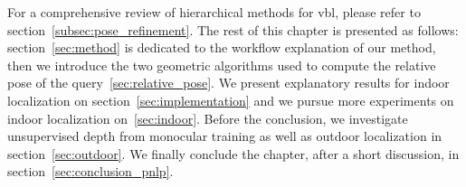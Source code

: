 For a comprehensive review of hierarchical methods for \ac{vbl}, please refer to section~\ref{subsec:pose_refinement}. The rest of this chapter is presented as follows: section~\ref{sec:method} is dedicated to the workflow explanation of our method, then we introduce the two geometric algorithms used to compute the relative pose of the query~\ref{sec:relative_pose}. We present explanatory results for indoor localization on section~\ref{sec:implementation} and we pursue more experiments on indoor localization on~\ref{sec:indoor}. Before the conclusion, we investigate unsupervised depth from monocular training as well as outdoor localization in section~\ref{sec:outdoor}. We finally conclude the chapter, after a short discussion, in section~\ref{sec:conclusion_pnlp}.
